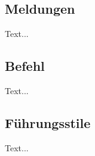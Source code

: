 \documentclass[notes]{beamer}
\begin{document}
	\subsection{Meldungen}
	\begin{frame}{\subsecname}
		
		Text...
		
	\end{frame}

	\subsection{Befehl}
	\begin{frame}{\subsecname}
		
		Text...
		
	\end{frame}

	\subsection{Führungsstile}
	\begin{frame}{\subsecname}
		
		Text...
		
	\end{frame}
	
\end{document}
